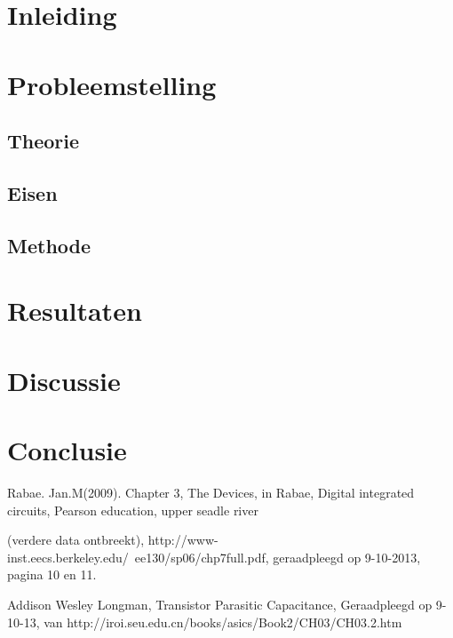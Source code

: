 \documentclass{report}
\begin{document}
\newcommand{\rp}{$\rightarrow$}
\newcommand{\Ohm}{$\Omega$}
\newcommand{\ohm}{$\omega$}
\newcommand{\gmu}{$\mu$}
\newcommand{\tss}{\textsubscript}
\newcommand{\lijst}{}


\tableofcontents
\chapter{Inleiding}


\chapter{Probleemstelling}


\section{Theorie}


\section{Eisen}


\section{Methode}


\chapter{Resultaten}


\chapter {Discussie}


\chapter{Conclusie}


\begin{thebibliography}{La}
%
Rabae. Jan.M(2009). Chapter 3, The Devices, in Rabae, Digital integrated circuits, Pearson education, upper seadle river

(verdere data ontbreekt), http://www-inst.eecs.berkeley.edu/~ee130/sp06/chp7full.pdf, geraadpleegd op 9-10-2013, pagina 10 en 11. 

 Addison Wesley Longman, Transistor Parasitic Capacitance, Geraadpleegd op 9-10-13, van http://iroi.seu.edu.cn/books/asics/Book2/CH03/CH03.2.htm

\end{thebibliography}
\end{document}
